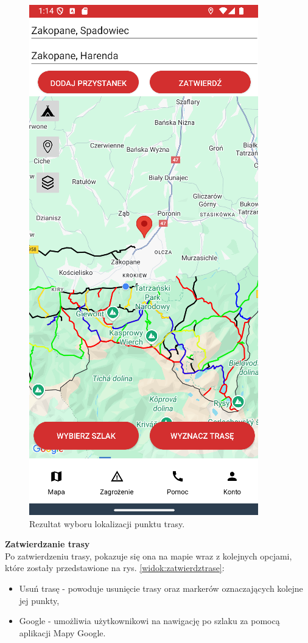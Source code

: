 \begin{figure}[H]
    \centering
    \includegraphics[scale=0.5]{img/imp/widok-pkt.png}
    \caption{Rezultat wyboru lokalizacji punktu trasy.}
    \label{widok:ustawlokalizacjewynik}
\end{figure}


\textbf{Zatwierdzanie trasy} \\
\indent Po zatwierdzeniu trasy, pokazuje się ona na mapie wraz z kolejnych opcjami, które zostały przedstawione na rys. \ref{widok:zatwierdztrase}:
\begin{itemize}
    \item Usuń trasę - powoduje usunięcie trasy oraz markerów oznaczających kolejne jej punkty,
    \item Google - umożliwia użytkownikowi na nawigację po szlaku za pomocą aplikacji Mapy Google.\\
\end{itemize}

